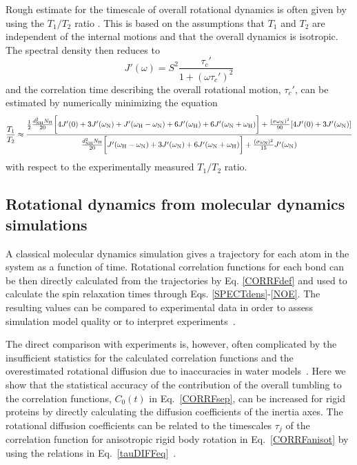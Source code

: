 \documentclass[journal=jpcbfk,manuscript=article]{achemso}
\providecommand{\DIFadd}[1]{{\protect\color{blue}\uwave{#1}}} %
\providecommand{\DIFaddbegin}{} %
\providecommand{\DIFaddend}{} %
\begin{document}
Rough estimate for the timescale of overall rotational dynamics 
is often given by using the $T_1/T_2$ ratio \cite{kay89}. 
This is based on the assumptions that $T_1$ and $T_2$
are independent of the internal motions and that the overall
dynamics is isotropic. The spectral density then reduces to 
\begin{equation}
J'(\omega) = S^2\frac{\tau_c'}{1+(\omega \tau_c')^2} 
\end{equation}
and the correlation time describing the overall rotational motion, $\tau_c'$, can 
be estimated by numerically minimizing the equation
\begin{equation}\label{ratioEQ}
  \frac{T_1}{T_2} \approx  \frac{\frac{1}{2}\frac{d_{\rm{NH}}^2N_{\rm{H}}}{20}\bigg[4J'(0)+3J'(\omega_{\rm{N}})+J'(\omega_{\rm{H}}-\omega_{\rm{N}})+6J'(\omega_{\rm{H}})  +6J'(\omega_{\rm{N}}+\omega_{\rm{H}})\bigg]+\frac{(\sigma \omega_{\rm{N}})^2}{90}[4J'(0) +3J'(\omega_{\rm{N}})]}{\frac{d_{\rm{NH}}^2N_{\rm{H}}}{20}\bigg[J'(\omega_{\rm{H}}-\omega_{\rm{N}})+3J'(\omega_{\rm{N}})+6J'(\omega_{\rm{N}}+\omega_{\rm{H}})\bigg] +\frac{(\sigma \omega_{\rm{N}})^2}{15}J'(\omega_{\rm{N}})}
\end{equation}
with respect to the experimentally measured $T_1/T_2$ ratio.

\subsection{Rotational dynamics from molecular dynamics simulations}\label{MDanalysis}
A classical molecular dynamics simulation gives a trajectory for each atom in
the system as a function of time. Rotational correlation functions for each bond
can be then directly calculated from the trajectories by Eq. \ref{CORRFdef}
and used to calculate the spin relaxation times through Eqs. \ref{SPECTdens}-\ref{NOE}.
The resulting values can be compared to experimental data in order to assess simulation model
quality \cite{best04,showalter07a,showalter07b,maragakis08,trbovic08,fisette12} or
to interpret experiments~\cite{fisette12}.

The direct comparison with experiments is, however, often complicated by
the insufficient statistics for the calculated correlation functions and the overestimated
rotational diffusion due to inaccuracies in \DIFaddbegin \DIFadd{the used }\DIFaddend water models~\cite{wong08,anderson12}.
Here we show that the statistical accuracy of the contribution of the
overall tumbling to the correlation functions, $C_0(t)$ in Eq.~\ref{CORRFsep}, can be increased for
rigid proteins by directly calculating the diffusion coefficients of the inertia axes.
The rotational diffusion coefficients can be related to the timescales $\tau_j$
of the correlation function for anisotropic rigid body rotation
in Eq.~\ref{CORRFanisot} by using the relations in Eq.~\ref{tauDIFFeq}~\cite{woessner62}.
\end{document}
